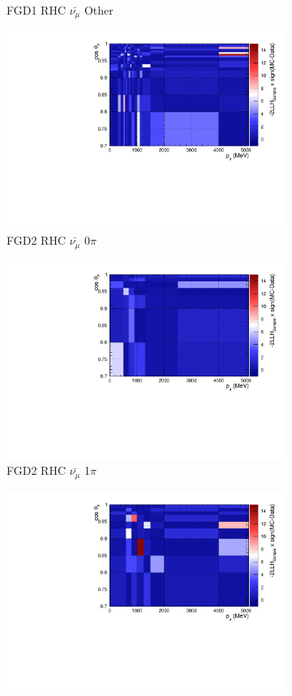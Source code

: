 \begin{figure}
\begin{subfigure}{.32\textwidth}
  \caption{FGD1 RHC $\bar{\nu_{\mu}}$ Other}
  \label{fig:llhcont_FGD1_anti-numuCC_other}
\end{subfigure}
\centering
\begin{subfigure}{.32\textwidth}
  \centering
  \includegraphics[width=0.85\linewidth]{figs/llhcont_FGD2_anti-numuCC_0pi.pdf}
  \caption{FGD2 RHC $\bar{\nu_{\mu}}$ 0$\pi$}
  \label{fig:llhcont_FGD2_anti-numuCC_0pi}
\end{subfigure}
\begin{subfigure}{.32\textwidth}
  \centering
  \includegraphics[width=0.85\linewidth]{figs/llhcont_FGD2_anti-numuCC_1pi.pdf}
  \caption{FGD2 RHC $\bar{\nu_{\mu}}$ 1$\pi$}
  \label{fig:llhcont_FGD2_anti-numuCC_1pi}
\end{subfigure}
\begin{subfigure}{.32\textwidth}
  \centering
  \includegraphics[width=0.85\linewidth]{figs/llhcont_FGD2_anti-numuCC_other.pdf}

\end{subfigure}
\end{figure}
